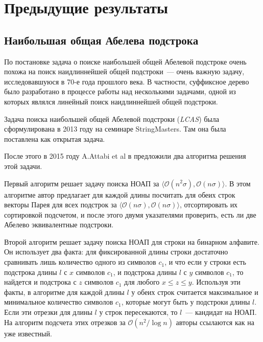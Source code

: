 \section{Предыдущие результаты}
\subsection{Наибольшая общая Абелева подстрока}
По постановке задача о поиске наибольшей общей Абелевой подстроке очень похожа на поиск наидлиннейшей общей подстроки~--- очень важную задачу, исследовавшуюся в 70-е года прошлого века. В частности, суффиксное дерево было разработано в процессе работы над несколькими задачами, одной из которых являлся линейный поиск наидлиннейшей общей подстроки.

Задача поиска наибольшей общей Абелевой подстроки (\textit{LCAS}) была сформулирована в 2013 году на семинаре StringMasters. Там она была поставлена как открытая задача. 

После этого в 2015 году A.Attabi et al в \cite{1} предложили два алгоритма решения этой задачи. 

Первый алгоритм решает задачу поиска НОАП за $\langle \mathcal{O}(n^2 \sigma), \mathcal{O}(n \sigma) \rangle$. В этом алгоритме автор предлагает для каждой длины посчитать для обеих строк векторы Парея для всех подстрок за $\langle \mathcal{O}(n \sigma), \mathcal{O}(n \sigma) \rangle$, отсортировать их сортировкой подсчетом, и после этого двумя указателями проверить, есть ли две Абелево эквивалентные подстроки.

Второй алгоритм решает задачу поиска НОАП для строки на бинарном алфавите. Он использует два факта: для фиксированной длины строки достаточно сравнивать лишь количество одного из символов $c_1$, и что если у строки есть подстрока длины $l$ с $x$ символов $c_1$, и подстрока длины $l$ с $y$ символов $c_1$, то найдется и подстрока с $z$ символов $c_1$ для любого $x \le z \le y$. Используя эти факты, в алгоритме для каждой длины $l$ у обеих строк считается максимальное и минимальное количество символов $c_1$, которые могут быть у подстроки длины $l$. Если эти отрезки для длины $l$ у строк пересекаются, то $l$~--- кандидат на НОАП. На алгоритм подсчета этих отрезков за $\mathcal{O}(n^2 / \log n)$ авторы ссылаются как на уже известный.


